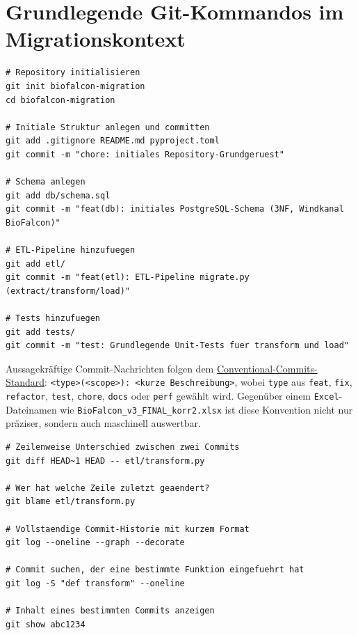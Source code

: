 \documentclass[12pt,a4paper]{report}
\theoremstyle{definition}
\theoremstyle{remark}
\newcommand{\excel}{\texttt{Excel}}
\newcommand{\code}[1]{\texttt{#1}}
\begin{document}
\section{Grundlegende Git-Kommandos im Migrationskontext}

\begin{lstlisting}[style=bash, caption={Repository initialisieren und Erstzustand sichern}]
# Repository initialisieren
git init biofalcon-migration
cd biofalcon-migration

# Initiale Struktur anlegen und committen
git add .gitignore README.md pyproject.toml
git commit -m "chore: initiales Repository-Grundgeruest"

# Schema anlegen
git add db/schema.sql
git commit -m "feat(db): initiales PostgreSQL-Schema (3NF, Windkanal BioFalcon)"

# ETL-Pipeline hinzufuegen
git add etl/
git commit -m "feat(etl): ETL-Pipeline migrate.py (extract/transform/load)"

# Tests hinzufuegen
git add tests/
git commit -m "test: Grundlegende Unit-Tests fuer transform und load"
\end{lstlisting}

Aussagekräftige Commit-Nachrichten folgen dem
\href{https://www.conventionalcommits.org/}{Conventional-Commits-Standard}:
\code{<type>(<scope>): <kurze Beschreibung>}, wobei \code{type} aus
\code{feat}, \code{fix}, \code{refactor}, \code{test}, \code{chore},
\code{docs} oder \code{perf} gewählt wird.
Gegenüber einem \excel-Dateinamen wie \code{BioFalcon\_\newline v3\_FINAL\_korr2.xlsx}
ist diese Konvention nicht nur präziser, sondern auch maschinell auswertbar.

\begin{lstlisting}[style=bash, caption={Diff und Blame: Nachvollziehen von Aenderungen}]
# Zeilenweise Unterschied zwischen zwei Commits
git diff HEAD~1 HEAD -- etl/transform.py

# Wer hat welche Zeile zuletzt geaendert?
git blame etl/transform.py

# Vollstaendige Commit-Historie mit kurzem Format
git log --oneline --graph --decorate

# Commit suchen, der eine bestimmte Funktion eingefuehrt hat
git log -S "def transform" --oneline

# Inhalt eines bestimmten Commits anzeigen
git show abc1234
\end{lstlisting}
\end{document}
